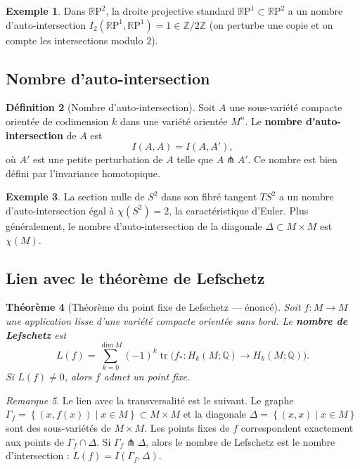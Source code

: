 \documentclass[12pt,a4paper,openany]{book}
\theoremstyle{definition}
\newtheorem{definition}{Définition}[chapter]
\newtheorem{exemple}[definition]{Exemple}
\theoremstyle{plain}
\newtheorem{theoreme}[definition]{Théorème}
\theoremstyle{remark}
\newtheorem{remarque}[definition]{Remarque}
\newcommand{\Z}{\mathbb{Z}}
\newcommand{\Q}{\mathbb{Q}}
\newcommand{\RP}{\mathbb{R}\mathrm{P}}
\newcommand{\set}[1]{\left\{#1\right\}}
\begin{document}
\begin{exemple}\label{ex:intersection-RP2}
Dans $\RP^2$, la droite projective standard $\RP^1 \subset \RP^2$ a un
nombre d'auto-intersection $I_2(\RP^1, \RP^1) = 1 \in \Z/2\Z$ (on
perturbe une copie et on compte les intersections modulo $2$).
\end{exemple}

\subsection{Nombre d'auto-intersection}\label{subsec:auto-intersection}

\begin{definition}[Nombre d'auto-intersection]%
\label{def:auto-intersection}
Soit $A$ une sous-variété compacte orientée de codimension $k$ dans une
variété orientée $M^n$. Le \textbf{nombre d'auto-intersection} de $A$
est
\[
  I(A, A) = I(A, A'),
\]
où $A'$ est une petite perturbation de $A$ telle que $A \pitchfork A'$.
Ce nombre est bien défini par l'invariance homotopique.
\end{definition}

\begin{exemple}\label{ex:auto-intersection-S2}
La section nulle de $S^2$ dans son fibré tangent $TS^2$ a un nombre
d'auto-intersection égal à $\chi(S^2) = 2$, la caractéristique d'Euler.
Plus généralement, le nombre d'auto-intersection de la diagonale
$\Delta \subset M \times M$ est $\chi(M)$.
\end{exemple}

\subsection{Lien avec le théorème de Lefschetz}\label{subsec:lefschetz}

\begin{theoreme}[Théorème du point fixe de Lefschetz --- énoncé]%
\label{thm:lefschetz}%
Soit $f \colon M \to M$ une application lisse d'une variété compacte
orientée sans bord. Le \textbf{nombre de Lefschetz} est
\[
  L(f) = \sum_{k=0}^{\dim M} (-1)^k \operatorname{tr}\bigl(f_* \colon
    H_k(M; \Q) \to H_k(M; \Q)\bigr).
\]
Si $L(f) \neq 0$, alors $f$ admet un point fixe.
\end{theoreme}

\begin{remarque}\label{rem:lefschetz-transversalite}
Le lien avec la transversalité est le suivant. Le graphe
$\Gamma_f = \set{(x, f(x)) \mid x \in M} \subset M \times M$ et la
diagonale $\Delta = \set{(x, x) \mid x \in M}$ sont des sous-variétés de
$M \times M$. Les points fixes de $f$ correspondent exactement aux points
de $\Gamma_f \cap \Delta$. Si $\Gamma_f \pitchfork \Delta$, alors le
nombre de Lefschetz est le nombre d'intersection :
$L(f) = I(\Gamma_f, \Delta)$.
\end{remarque}
\end{document}
